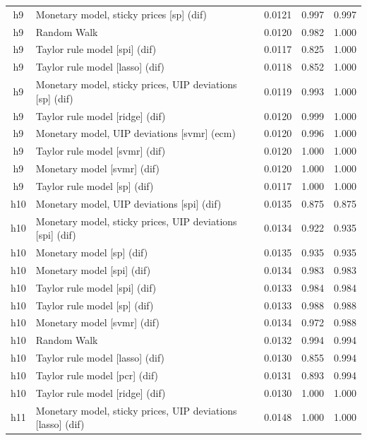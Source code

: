 \begin{ThreePartTable}
\begin{longtable}[t]{cp{5.5cm}ccc}
h9 & \raggedright Monetary model, sticky prices [sp] (dif) & 0.0121 & 0.997 & 0.997\\
h9 & \raggedright Random Walk & 0.0120 & 0.982 & 1.000\\
h9 & \raggedright Taylor rule model [spi] (dif) & 0.0117 & 0.825 & 1.000\\
h9 & \raggedright Taylor rule model [lasso] (dif) & 0.0118 & 0.852 & 1.000\\
h9 & \raggedright Monetary model, sticky prices, UIP deviations [sp] (dif) & 0.0119 & 0.993 & 1.000\\
h9 & \raggedright Taylor rule model [ridge] (dif) & 0.0120 & 0.999 & 1.000\\
h9 & \raggedright Monetary model, UIP deviations [svmr] (ecm) & 0.0120 & 0.996 & 1.000\\
h9 & \raggedright Taylor rule model [svmr] (dif) & 0.0120 & 1.000 & 1.000\\
h9 & \raggedright Monetary model [svmr] (dif) & 0.0120 & 1.000 & 1.000\\
h9 & \raggedright Taylor rule model [sp] (dif) & 0.0117 & 1.000 & 1.000\\
\addlinespace
h10 & \raggedright Monetary model, UIP deviations [spi] (dif) & 0.0135 & 0.875 & 0.875\\
h10 & \raggedright Monetary model, sticky prices, UIP deviations [spi] (dif) & 0.0134 & 0.922 & 0.935\\
h10 & \raggedright Monetary model [sp] (dif) & 0.0135 & 0.935 & 0.935\\
h10 & \raggedright Monetary model [spi] (dif) & 0.0134 & 0.983 & 0.983\\
h10 & \raggedright Taylor rule model [spi] (dif) & 0.0133 & 0.984 & 0.984\\
h10 & \raggedright Taylor rule model [sp] (dif) & 0.0133 & 0.988 & 0.988\\
h10 & \raggedright Monetary model [svmr] (dif) & 0.0134 & 0.972 & 0.988\\
h10 & \raggedright Random Walk & 0.0132 & 0.994 & 0.994\\
h10 & \raggedright Taylor rule model [lasso] (dif) & 0.0130 & 0.855 & 0.994\\
h10 & \raggedright Taylor rule model [pcr] (dif) & 0.0131 & 0.893 & 0.994\\
h10 & \raggedright Taylor rule model [ridge] (dif) & 0.0130 & 1.000 & 1.000\\
\addlinespace
h11 & \raggedright Monetary model, sticky prices, UIP deviations [lasso] (dif) & 0.0148 & 1.000 & 1.000\\

\end{longtable}
\end{ThreePartTable}
